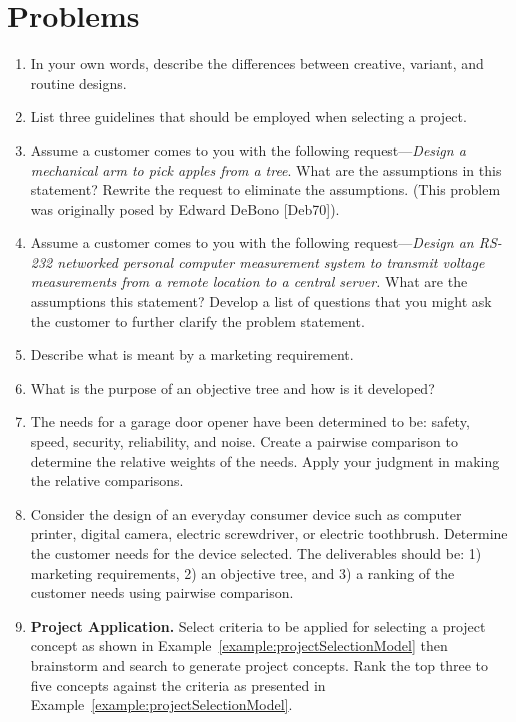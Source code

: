 \section{Problems}
\label{section:problems}


\begin{enumerate}
\def\labelenumi{\arabic{enumi}.}
\item
  In your own words, describe the differences between creative, variant,
  and routine designs.
\item
  List three guidelines that should be employed when selecting a
  project.
\item
  Assume a customer comes to you with the following
  request---\emph{Design a mechanical arm to pick apples from a tree}.
  What are the assumptions in this statement? Rewrite the request to
  eliminate the assumptions. (This problem was originally posed by
  Edward DeBono {[}Deb70{]}).
\item
  Assume a customer comes to you with the following
  request---\emph{Design an RS-232 networked personal computer
  measurement system to transmit voltage measurements from a remote
  location to a central server.} What are the assumptions this
  statement? Develop a list of questions that you might ask the customer
  to further clarify the problem statement.
\item
  Describe what is meant by a marketing requirement.
\item
  What is the purpose of an objective tree and how is it developed?
\item
  The needs for a garage door opener have been determined to be: safety,
  speed, security, reliability, and noise. Create a pairwise comparison
  to determine the relative weights of the needs. Apply your judgment in
  making the relative comparisons.
\item
  Consider the design of an everyday consumer device such as computer
  printer, digital camera, electric screwdriver, or electric toothbrush.
  Determine the customer needs for the device selected. The deliverables
  should be: 1) marketing requirements, 2) an objective tree, and 3) a
  ranking of the customer needs using pairwise comparison.
\item
  \textbf{Project Application.} Select criteria to be applied for
  selecting a project concept as shown in Example~\ref{example:projectSelectionModel}
  then brainstorm and search to generate project concepts. Rank the top three to five
  concepts against the criteria as presented in Example~\ref{example:projectSelectionModel}.

\end{enumerate}
